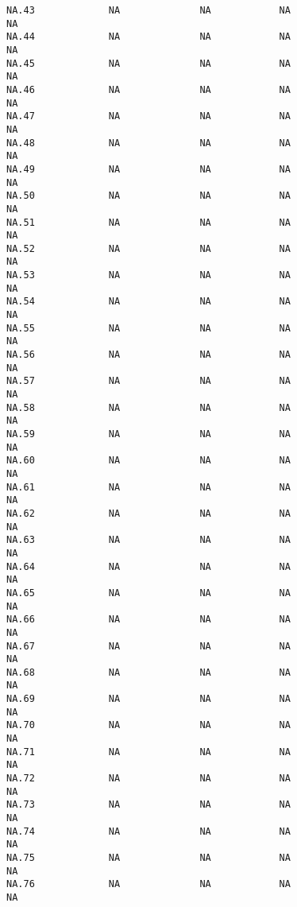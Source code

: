 \documentclass[
  letterpaper,
  DIV=11,
  numbers=noendperiod]{scrartcl}
\begin{document}
\begin{verbatim}
NA.43             NA              NA            NA                        NA
NA.44             NA              NA            NA                        NA
NA.45             NA              NA            NA                        NA
NA.46             NA              NA            NA                        NA
NA.47             NA              NA            NA                        NA
NA.48             NA              NA            NA                        NA
NA.49             NA              NA            NA                        NA
NA.50             NA              NA            NA                        NA
NA.51             NA              NA            NA                        NA
NA.52             NA              NA            NA                        NA
NA.53             NA              NA            NA                        NA
NA.54             NA              NA            NA                        NA
NA.55             NA              NA            NA                        NA
NA.56             NA              NA            NA                        NA
NA.57             NA              NA            NA                        NA
NA.58             NA              NA            NA                        NA
NA.59             NA              NA            NA                        NA
NA.60             NA              NA            NA                        NA
NA.61             NA              NA            NA                        NA
NA.62             NA              NA            NA                        NA
NA.63             NA              NA            NA                        NA
NA.64             NA              NA            NA                        NA
NA.65             NA              NA            NA                        NA
NA.66             NA              NA            NA                        NA
NA.67             NA              NA            NA                        NA
NA.68             NA              NA            NA                        NA
NA.69             NA              NA            NA                        NA
NA.70             NA              NA            NA                        NA
NA.71             NA              NA            NA                        NA
NA.72             NA              NA            NA                        NA
NA.73             NA              NA            NA                        NA
NA.74             NA              NA            NA                        NA
NA.75             NA              NA            NA                        NA
NA.76             NA              NA            NA                        NA

\end{verbatim}
\end{document}
